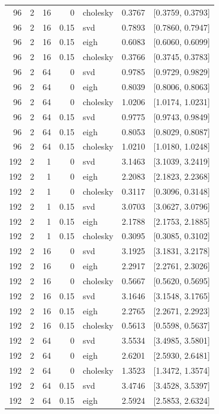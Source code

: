 \begin{tabular}{rrrrlrr}
96 & 2 & 16 & 0 & cholesky & 0.3767 & [0.3759, 0.3793] \\
96 & 2 & 16 & 0.15 & svd & 0.7893 & [0.7860, 0.7947] \\
96 & 2 & 16 & 0.15 & eigh & 0.6083 & [0.6060, 0.6099] \\
96 & 2 & 16 & 0.15 & cholesky & 0.3766 & [0.3745, 0.3783] \\
96 & 2 & 64 & 0 & svd & 0.9785 & [0.9729, 0.9829] \\
96 & 2 & 64 & 0 & eigh & 0.8039 & [0.8006, 0.8063] \\
96 & 2 & 64 & 0 & cholesky & 1.0206 & [1.0174, 1.0231] \\
96 & 2 & 64 & 0.15 & svd & 0.9775 & [0.9743, 0.9849] \\
96 & 2 & 64 & 0.15 & eigh & 0.8053 & [0.8029, 0.8087] \\
96 & 2 & 64 & 0.15 & cholesky & 1.0210 & [1.0180, 1.0248] \\
192 & 2 & 1 & 0 & svd & 3.1463 & [3.1039, 3.2419] \\
192 & 2 & 1 & 0 & eigh & 2.2083 & [2.1823, 2.2368] \\
192 & 2 & 1 & 0 & cholesky & 0.3117 & [0.3096, 0.3148] \\
192 & 2 & 1 & 0.15 & svd & 3.0703 & [3.0627, 3.0796] \\
192 & 2 & 1 & 0.15 & eigh & 2.1788 & [2.1753, 2.1885] \\
192 & 2 & 1 & 0.15 & cholesky & 0.3095 & [0.3085, 0.3102] \\
192 & 2 & 16 & 0 & svd & 3.1925 & [3.1831, 3.2178] \\
192 & 2 & 16 & 0 & eigh & 2.2917 & [2.2761, 2.3026] \\
192 & 2 & 16 & 0 & cholesky & 0.5667 & [0.5620, 0.5695] \\
192 & 2 & 16 & 0.15 & svd & 3.1646 & [3.1548, 3.1765] \\
192 & 2 & 16 & 0.15 & eigh & 2.2765 & [2.2671, 2.2923] \\
192 & 2 & 16 & 0.15 & cholesky & 0.5613 & [0.5598, 0.5637] \\
192 & 2 & 64 & 0 & svd & 3.5534 & [3.4985, 3.5801] \\
192 & 2 & 64 & 0 & eigh & 2.6201 & [2.5930, 2.6481] \\
192 & 2 & 64 & 0 & cholesky & 1.3523 & [1.3472, 1.3574] \\
192 & 2 & 64 & 0.15 & svd & 3.4746 & [3.4528, 3.5397] \\
192 & 2 & 64 & 0.15 & eigh & 2.5924 & [2.5853, 2.6324] \\

\end{tabular}
